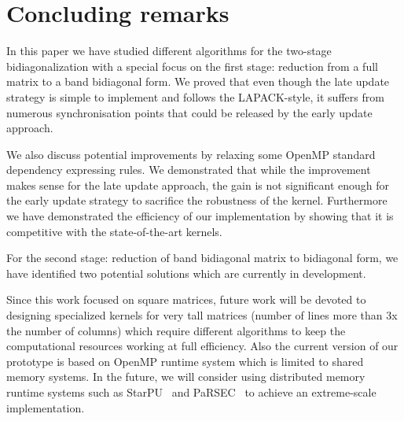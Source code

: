 \section{Concluding remarks}\label{sec:conclusion}
In this paper we have studied different algorithms for
the two-stage bidiagonalization with
a special focus on the first stage:
reduction from a full matrix to a band bidiagonal form.
We proved that even though the late update strategy
is simple to implement and follows the LAPACK-style,
it suffers from numerous synchronisation points that could be
released by the early update approach.

We also discuss potential improvements by relaxing
some OpenMP standard dependency expressing rules.
We demonstrated that while the improvement makes sense for the
late update approach,
the gain is not significant enough for the early update strategy
to sacrifice the robustness of the kernel.
Furthermore we have demonstrated the efficiency of our
implementation by showing that it is competitive
with the state-of-the-art kernels.

For the second stage:
reduction of band bidiagonal matrix to bidiagonal form,
we have identified two potential solutions which are
currently in development.

Since this work focused on square matrices,
future work will be devoted to designing specialized kernels
for very tall matrices
(number of lines more than 3x the number of columns)
which require different algorithms to keep the
computational resources working at full efficiency.
Also the current version of our prototype is based on
OpenMP runtime system which is limited to shared memory systems.
In the future,
we will consider using distributed memory runtime
systems such as StarPU~\cite{AugThiNamWac11CCPE} and
PaRSEC~\cite{bosilca2013parsec}
to achieve an extreme-scale implementation.
